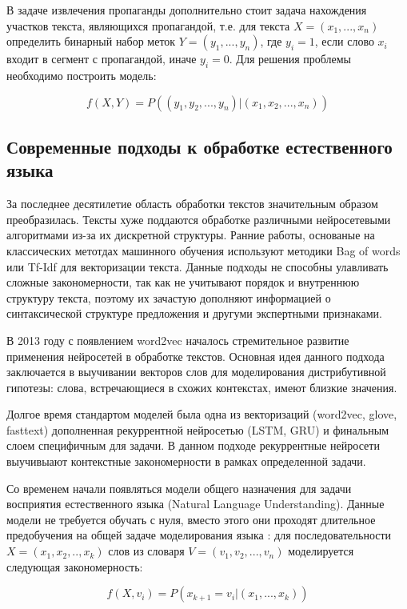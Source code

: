 В задаче извлечения пропаганды дополнительно стоит задача нахождения участков текста, являющихся пропагандой, т.е. для текста $X = (x_1, ..., x_n)$ определить бинарный набор меток $Y = (y_1, ..., y_n)$, где $y_i = 1$, если слово $x_i$ входит в сегмент с пропагандой, иначе $y_i = 0$. Для решения проблемы необходимо построить модель:

\begin{equation*}
    f(X, Y) = P((y_1, y_2, ..., y_n) | (x_1, x_2, ..., x_n))
\end{equation*}

\subsection{Современные подходы к обработке естественного языка}
За последнее десятилетие область обработки текстов значительным образом преобразилась. Тексты хуже поддаются обработке различными нейросетевыми алгоритмами из-за их дискретной структуры. Ранние работы, основаные на классических метотдах машинного обучения используют методики Bag of words или Tf-Idf для векторизации текста. Данные подходы не способны улавливать сложные закономерности, так как не учитывают порядок и внутреннюю структуру текста, поэтому их зачастую дополняют информацией о синтаксической структуре предложения и другуми экспертными признаками.

В 2013 году с появлением word2vec \cite{mikolov2013efficient} началось стремительное развитие применения нейросетей в обработке текстов. Основная идея данного подхода заключается в выучивании векторов слов для моделирования дистрибутивной гипотезы: слова, встречающиеся в схожих контекстах, имеют близкие значения.

Долгое время стандартом моделей была одна из векторизаций (word2vec, glove, fasttext) дополненная рекуррентной нейросетью (LSTM, GRU) \cite{hochreiter1997lstm} и финальным слоем специфичным для задачи.  В данном подходе рекуррентные нейросети выучивыают контекстные закономерности в рамках определенной задачи.

Со временем начали появляться модели общего назначения для задачи восприятия естественного языка (Natural Language Understanding). Данные модели не требуется обучать с нуля, вместо этого они проходят длительное предобучения на общей задаче моделирования языка \cite{Peters:2018}: для последовательности $X = (x_1, x_2, .., x_k)$ слов из словаря $V = (v_1, v_2, ..., v_n)$ моделируется следующая закономерность:

\begin{equation*}
    f(X, v_i) = P(x_{k+1} = v_i| (x_1, ..., x_k))
\end{equation*}


